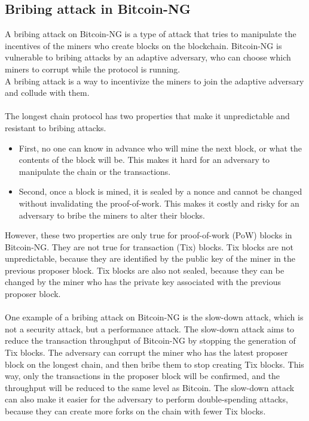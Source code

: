 \subsection{Bribing attack in Bitcoin-NG}
A bribing attack on Bitcoin-NG is a type of attack that tries to manipulate the incentives of the miners who create blocks on the blockchain.
Bitcoin-NG is vulnerable to bribing attacks by an adaptive adversary, who can choose which miners to corrupt while the protocol is running.\\
A bribing attack is a way to incentivize the miners to join the adaptive adversary and collude with them.\\\\
The longest chain protocol has two properties that make it unpredictable and resistant to bribing attacks.
\begin{itemize}
	\item First, no one can know in advance who will mine the next block, or what the contents of the block will be. This makes it hard for an adversary to manipulate the chain or the transactions.
	\item Second, once a block is mined, it is sealed by a nonce and cannot be changed without invalidating the proof-of-work. This makes it costly and risky for an adversary to bribe the miners to alter their blocks.
\end{itemize} 
However, these two properties are only true for proof-of-work (PoW) blocks in Bitcoin-NG. They are not true for transaction (Tix) blocks. Tix blocks are not unpredictable, because they are identified by the public key of the miner in the previous proposer block. Tix blocks are also not sealed, because they can be changed by the miner who has the private key associated with the previous proposer block.\\\\
One example of a bribing attack on Bitcoin-NG is the slow-down attack, which is not a security attack, but a performance attack. The slow-down attack aims to reduce the transaction throughput of Bitcoin-NG by stopping the generation of Tix blocks. The adversary can corrupt the miner who has the latest proposer block on the longest chain, and then bribe them to stop creating Tix blocks. This way, only the transactions in the proposer block will be confirmed, and the throughput will be reduced to the same level as Bitcoin. The slow-down attack can also make it easier for the adversary to perform double-spending attacks, because they can create more forks on the chain with fewer Tix blocks.

